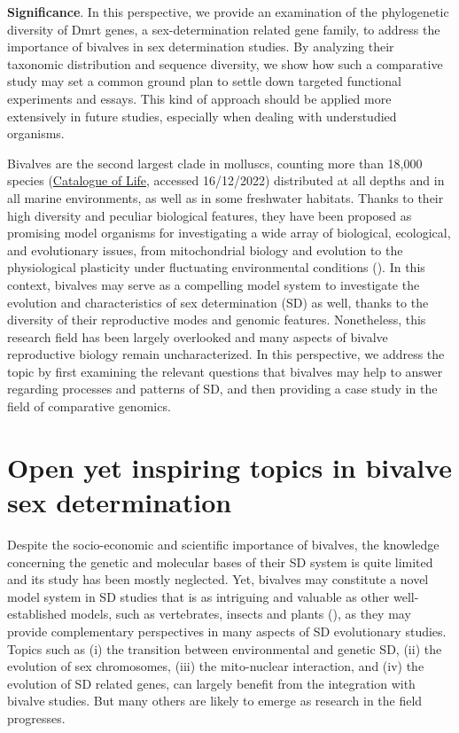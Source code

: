 \documentclass[../main.tex]{subfiles}
\begin{document}
\textbf{Significance}. In this perspective, we provide an examination of the phylogenetic diversity of Dmrt genes, a sex-determination related gene family, to address the importance of bivalves in sex determination studies. By analyzing their taxonomic distribution and sequence diversity, we show how such a comparative study may set a common ground plan to settle down targeted functional experiments and essays. This kind of approach should be applied more extensively in future studies, especially when dealing with understudied organisms.

\newpage

Bivalves are the second largest clade in molluscs, counting more than 18,000 species (\href{https://www.catalogueoflife.org/}{Catalogue of Life}, accessed 16/12/2022) distributed at all depths and in all marine environments, as well as in some freshwater habitats. Thanks to their high diversity and peculiar biological features, they have been proposed as promising model organisms for investigating a wide array of biological, ecological, and evolutionary issues, from mitochondrial biology and evolution to the physiological plasticity under fluctuating environmental conditions (\textbf{\cite{milani2020faraway, ghiselli2021bivalve}}). In this context, bivalves may serve as a compelling model system to investigate the evolution and characteristics of sex determination (SD) as well, thanks to the diversity of their reproductive modes and genomic features. Nonetheless, this research field has been largely overlooked and many aspects of bivalve reproductive biology remain uncharacterized. In this perspective, we address the topic by first examining the relevant questions that bivalves may help to answer regarding processes and patterns of SD, and then providing a case study in the field of comparative genomics.

\section{Open yet inspiring topics in bivalve sex determination}
Despite the socio-economic and scientific importance of bivalves, the knowledge concerning the genetic and molecular bases of their SD system is quite limited and its study has been mostly neglected. Yet, bivalves may constitute a novel model system in SD studies that is as intriguing and valuable as other well-established models, such as vertebrates, insects and plants (\textbf{\cite{tree2014tree}}), as they may provide complementary perspectives in many aspects of SD evolutionary studies. Topics such as (i) the transition between environmental and genetic SD, (ii) the evolution of sex chromosomes, (iii) the mito-nuclear interaction, and (iv) the evolution of SD related genes, can largely benefit from the integration with bivalve studies. But many others are likely to emerge as research in the field progresses.
\end{document}
